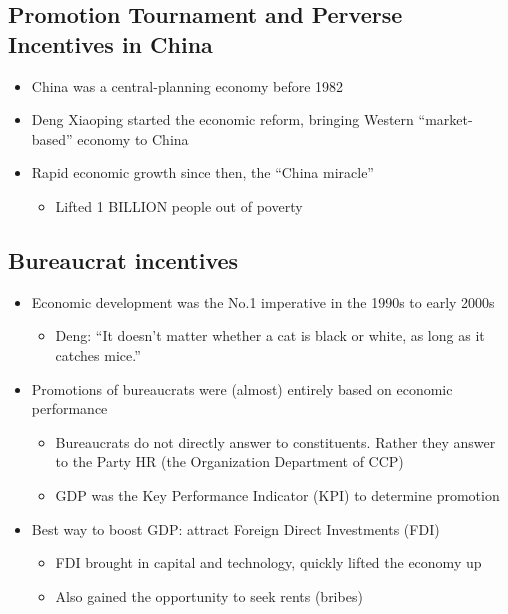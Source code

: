 \documentclass[
]{article}
\providecommand{\tightlist}{%
  \setlength{\itemsep}{0pt}\setlength{\parskip}{0pt}}
\begin{document}
\hypertarget{promotion-tournament-and-perverse-incentives-in-china}{%
\subsection{Promotion Tournament and Perverse Incentives in
China}\label{promotion-tournament-and-perverse-incentives-in-china}}

\begin{itemize}
\tightlist
\item
  China was a central-planning economy before 1982
\item
  Deng Xiaoping started the economic reform, bringing Western
  ``market-based'' economy to China
\item
  Rapid economic growth since then, the ``China miracle''

  \begin{itemize}
  \tightlist
  \item
    Lifted 1 BILLION people out of poverty
  \end{itemize}
\end{itemize}

\hypertarget{bureaucrat-incentives}{%
\subsection{Bureaucrat incentives}\label{bureaucrat-incentives}}

\begin{itemize}
\tightlist
\item
  Economic development was the No.1 imperative in the 1990s to early
  2000s

  \begin{itemize}
  \tightlist
  \item
    Deng: ``It doesn't matter whether a cat is black or white, as long
    as it catches mice.''
  \end{itemize}
\item
  Promotions of bureaucrats were (almost) entirely based on economic
  performance

  \begin{itemize}
  \tightlist
  \item
    Bureaucrats do not directly answer to constituents. Rather they
    answer to the Party HR (the Organization Department of CCP)
  \item
    GDP was the Key Performance Indicator (KPI) to determine promotion
  \end{itemize}
\item
  Best way to boost GDP: attract Foreign Direct Investments (FDI)

  \begin{itemize}
  \tightlist
  \item
    FDI brought in capital and technology, quickly lifted the economy up
  \item
    Also gained the opportunity to seek rents (bribes)
  \end{itemize}
\end{itemize}
\end{document}
